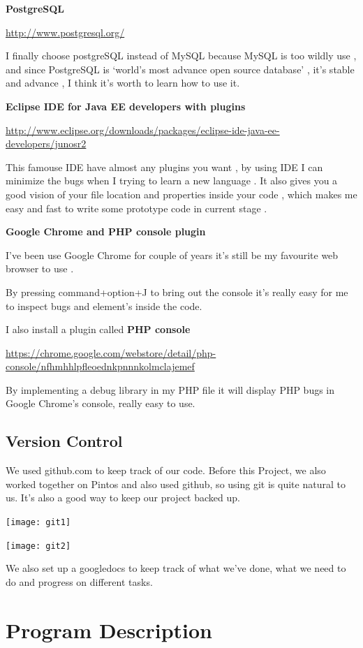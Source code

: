 \documentclass[a4wide, 11pt]{article}
\begin{document}
\textbf{PostgreSQL}

\url{http://www.postgresql.org/}

I finally choose postgreSQL instead of MySQL because MySQL is too wildly use , and since PostgreSQL is ‘world’s most advance open source database’ , it’s stable and advance , I think it’s worth to learn how to use it.

\textbf{Eclipse IDE for Java EE developers with plugins}

\url{http://www.eclipse.org/downloads/packages/eclipse-ide-java-ee-developers/junosr2}

This famouse IDE have almost any plugins you want , by using IDE I can minimize the bugs when I trying to learn a new language . It also gives you a good vision of your file location and properties inside your code , which makes me easy and fast to write some prototype code in current stage . 

\textbf{Google Chrome and PHP console plugin}

I’ve been use Google Chrome for couple of years it’s still be my favourite web browser to use .

By pressing command+option+J to bring out the console it’s really easy for me to inspect bugs and element’s inside the code.

I also install a plugin called \textbf{PHP console}

\url{https://chrome.google.com/webstore/detail/php-console/nfhmhhlpfleoednkpnnnkolmclajemef}

By implementing a debug library in my PHP file it will display PHP bugs in Google Chrome’s console, really easy to use.

\subsection{Version Control}

We used github.com to keep track of our code. Before this Project, we also worked together on Pintos and also used github, so using git is quite natural to us. It’s also a good way to keep our project backed up.

\texttt{[image: git1]}

\texttt{[image: git2]}

We also set up a googledocs to keep track of what we’ve done, what we need to do and progress on different tasks.

\section{Program Description}
\end{document}
